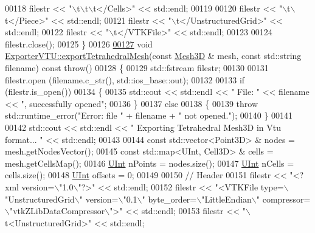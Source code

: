 \begin{DoxyCode}
00118     filestr << \textcolor{stringliteral}{"\(\backslash\)t\(\backslash\)t\(\backslash\)t</Cells>"} << std::endl;
00119 
00120     filestr << \textcolor{stringliteral}{"\(\backslash\)t\(\backslash\)t</Piece>"} << std::endl;
00121     filestr << \textcolor{stringliteral}{"\(\backslash\)t</UnstructuredGrid>"} << std::endl;
00122     filestr << \textcolor{stringliteral}{"\(\backslash\)t</VTKFile>"} << std::endl;
00123 
00124     filestr.close();
00125 \}
00126 
\hypertarget{ExportVTU_8cpp_source.tex_l00127}{}\hyperlink{classFVCode3D_1_1ExporterVTU_ac043bd93a6a079f864bc1b76a21df6a2}{00127} \textcolor{keywordtype}{void} \hyperlink{classFVCode3D_1_1ExporterVTU_ac043bd93a6a079f864bc1b76a21df6a2}{ExporterVTU::exportTetrahedralMesh}(\textcolor{keyword}{const} 
      \hyperlink{classFVCode3D_1_1Mesh3D}{Mesh3D} & mesh, \textcolor{keyword}{const} std::string filename) \textcolor{keyword}{const} \textcolor{keywordflow}{throw}()
00128 \{
00129     std::fstream filestr;
00130 
00131     filestr.open (filename.c\_str(), std::ios\_base::out);
00132 
00133     \textcolor{keywordflow}{if} (filestr.is\_open())
00134     \{
00135         std::cout << std::endl << \textcolor{stringliteral}{" File: "} << filename << \textcolor{stringliteral}{", successfully opened"};
00136     \}
00137     \textcolor{keywordflow}{else}
00138     \{
00139         \textcolor{keywordflow}{throw} std::runtime\_error(\textcolor{stringliteral}{"Error: file "} + filename + \textcolor{stringliteral}{" not opened."});
00140     \}
00141 
00142     std::cout << std::endl << \textcolor{stringliteral}{" Exporting Tetrahedral Mesh3D in Vtu format... "} << std::endl;
00143 
00144     \textcolor{keyword}{const} std::vector<Point3D> & nodes = mesh.getNodesVector();
00145     \textcolor{keyword}{const} std::map<UInt, Cell3D> & cells = mesh.getCellsMap();
00146     \hyperlink{namespaceFVCode3D_a4bf7e328c75d0fd504050d040ebe9eda}{UInt} nPoints = nodes.size();
00147     \hyperlink{namespaceFVCode3D_a4bf7e328c75d0fd504050d040ebe9eda}{UInt} nCells = cells.size();
00148     \hyperlink{namespaceFVCode3D_a4bf7e328c75d0fd504050d040ebe9eda}{UInt} offsets = 0;
00149 
00150     \textcolor{comment}{// Header}
00151     filestr << \textcolor{stringliteral}{"<?xml version=\(\backslash\)"1.0\(\backslash\)"?>"} << std::endl;
00152     filestr << \textcolor{stringliteral}{"<VTKFile type=\(\backslash\)"UnstructuredGrid\(\backslash\)" version=\(\backslash\)"0.1\(\backslash\)" byte\_order=\(\backslash\)"LittleEndian\(\backslash\)" compressor=
      \(\backslash\)"vtkZLibDataCompressor\(\backslash\)">"} << std::endl;
00153     filestr << \textcolor{stringliteral}{"\(\backslash\)t<UnstructuredGrid>"} << std::endl;

\end{DoxyCode}
